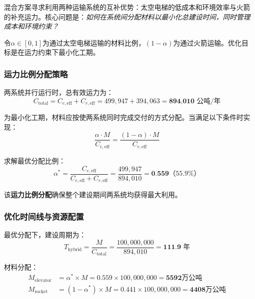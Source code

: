 混合方案寻求利用两种运输系统的互补优势：太空电梯的低成本和环境效率与火箭的补充运力。核心问题是：\textit{如何在系统间分配材料以最小化总建设时间，同时管理成本和环境约束？}

令$\alpha \in [0,1]$为通过太空电梯运输的材料比例，$(1-\alpha)$为通过火箭运输。优化目标是在运力约束下最小化工期。

\subsubsection{运力比例分配策略}

两系统并行运行时，总有效运力为：
\begin{equation}
    C_{\text{total}} = C_{e,\text{eff}} + C_{r,\text{eff}} = 499,947 + 394,063 = \textbf{894,010 公吨/年}
    \label{eq:total_capacity}
\end{equation}

为最小化工期，材料应按使两系统同时完成交付的方式分配。当满足以下条件时实现：
\begin{equation}
    \frac{\alpha \cdot M}{C_{e,\text{eff}}} = \frac{(1-\alpha) \cdot M}{C_{r,\text{eff}}}
    \label{eq:simultaneous_completion}
\end{equation}

求解最优分配比例：
\begin{equation}
    \alpha^* = \frac{C_{e,\text{eff}}}{C_{e,\text{eff}} + C_{r,\text{eff}}} = \frac{499,947}{894,010} = \textbf{0.559}（55.9\%）
    \label{eq:optimal_alpha}
\end{equation}

该\textbf{运力比例分配}确保整个建设期间两系统均获得最大利用。

\subsubsection{优化时间线与资源配置}

最优分配下，建设周期为：
\begin{equation}
    T_{\text{hybrid}} = \frac{M}{C_{\text{total}}} = \frac{100,000,000}{894,010} = \textbf{111.9 年}
    \label{eq:hybrid_timeline}
\end{equation}

材料分配：
\begin{align}
    M_{\text{elevator}} &= \alpha^* \times M = 0.559 \times 100,000,000 = \textbf{5592万公吨} \\
    M_{\text{rocket}} &= (1-\alpha^*) \times M = 0.441 \times 100,000,000 = \textbf{4408万公吨}
    \label{eq:material_allocation}
\end{align}

